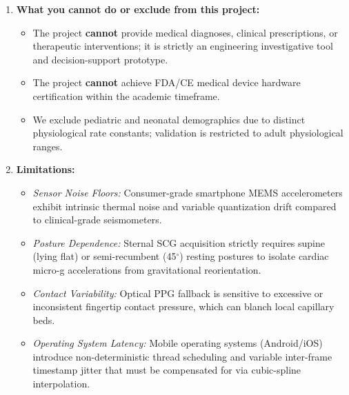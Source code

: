 \documentclass[11pt,a4paper]{article}
\begin{document}
\begin{enumerate}[leftmargin=2.5em]
    \item \textbf{What you cannot do or exclude from this project:}
    \begin{itemize}
        \item The project \textbf{cannot} provide medical diagnoses, clinical prescriptions, or therapeutic interventions; it is strictly an engineering investigative tool and decision-support prototype.
        \item The project \textbf{cannot} achieve FDA/CE medical device hardware certification within the academic timeframe.
        \item We exclude pediatric and neonatal demographics due to distinct physiological rate constants; validation is restricted to adult physiological ranges.
    \end{itemize}

    \item \textbf{Limitations:}
    \begin{itemize}
        \item \textit{Sensor Noise Floors:} Consumer-grade smartphone MEMS accelerometers exhibit intrinsic thermal noise and variable quantization drift compared to clinical-grade seismometers.
        \item \textit{Posture Dependence:} Sternal SCG acquisition strictly requires supine (lying flat) or semi-recumbent (45$^\circ$) resting postures to isolate cardiac micro-g accelerations from gravitational reorientation.
        \item \textit{Contact Variability:} Optical PPG fallback is sensitive to excessive or inconsistent fingertip contact pressure, which can blanch local capillary beds.
        \item \textit{Operating System Latency:} Mobile operating systems (Android/iOS) introduce non-deterministic thread scheduling and variable inter-frame timestamp jitter that must be compensated for via cubic-spline interpolation.
    \end{itemize}


\end{enumerate}
\end{document}
